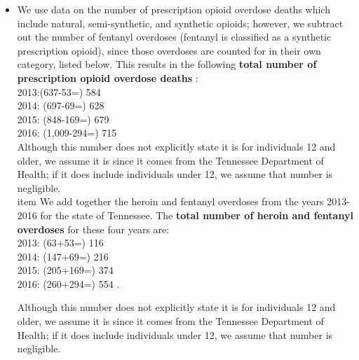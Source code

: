 \documentclass[12pt]{article}
\begin{document}
\begin{itemize}

\item We use data on the number of prescription opioid overdose deaths which include natural, semi-synthetic, and synthetic opioids; however, we subtract out the number of fentanyl overdoses (fentanyl is classified as a synthetic prescription opioid), since those overdoses are counted for in their own category, listed below. This results in the following  \textbf{total number of prescription opioid overdose deaths} \cite{PDO}: \\
2013:(637-53=) 584 \\
2014: (697-69=) 628 \\
2015: (848-169=) 679 \\
2016: (1,009-294=) 715 \\

Although this number does not explicitly state it is for individuals 12 and older, we assume it is since it comes from the Tennessee Department of Health; if it does include individuals under 12, we assume that number is negligible. \\

item We add together the heroin and fentanyl overdoses from the years 2013-2016 for the state of Tennessee. The \textbf{total number of heroin and fentanyl overdoses} for these four years are: \\
2013: (63+53=) 116 \\
2014: (147+69=) 216 \\
2015: (205+169=) 374 \\
2016: (260+294=) 554 \cite{PDO}. 

Although this number does not explicitly state it is for individuals 12 and older, we assume it is since it comes from the Tennessee Department of Health; if it does include individuals under 12, we assume that number is negligible. \\



\end{itemize}
\end{document}

